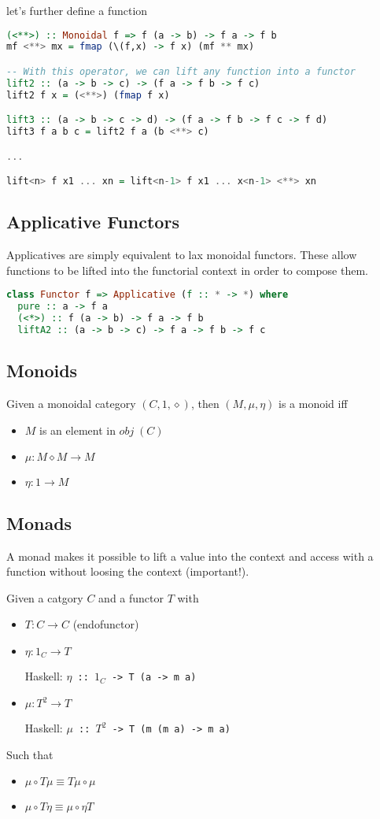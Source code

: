 let's further define a function
\begin{lstlisting}[language=haskell]
(<**>) :: Monoidal f => f (a -> b) -> f a -> f b
mf <**> mx = fmap (\(f,x) -> f x) (mf ** mx)

-- With this operator, we can lift any function into a functor
lift2 :: (a -> b -> c) -> (f a -> f b -> f c)
lift2 f x = (<**>) (fmap f x)

lift3 :: (a -> b -> c -> d) -> (f a -> f b -> f c -> f d)
lift3 f a b c = lift2 f a (b <**> c)

...

lift<n> f x1 ... xn = lift<n-1> f x1 ... x<n-1> <**> xn
\end{lstlisting}

\subsection{Applicative Functors}
Applicatives are simply equivalent to lax monoidal functors. These allow functions to be lifted into the functorial context in order to compose them.

\begin{lstlisting}[language=haskell]
class Functor f => Applicative (f :: * -> *) where
  pure :: a -> f a
  (<*>) :: f (a -> b) -> f a -> f b
  liftA2 :: (a -> b -> c) -> f a -> f b -> f c
\end{lstlisting}

\subsection{Monoids}
Given a monoidal category $(C, 1, \diamond)$, then $(M, \mu, \eta)$ is a monoid iff
\begin{itemize}
  \item $M$ is an element in $obj\;(C)$
  \item $\mu : M \diamond M \to M$
  \item $\eta : 1 \to M$
\end{itemize}

\subsection{Monads}
A monad makes it possible to lift a value into the context and access with a function without loosing the context (important!).

Given a catgory $C$ and a functor $T$ with
\begin{itemize}
  \item $T : C \to C$ (endofunctor)
  \item $\eta : 1_C \to T$
  
  Haskell: \texttt{$\eta$ :: $1_C$ -> T (a -> m a)}
  \item $\mu : T^2 \to T$

  Haskell: \texttt{$\mu$ :: $T^2$ -> T (m (m a) -> m a)}
\end{itemize}
Such that
\begin{itemize}
  \item $\mu \circ T \mu \equiv T \mu \circ \mu$
  \item $\mu \circ T \eta \equiv \mu \circ \eta T$
\end{itemize}

